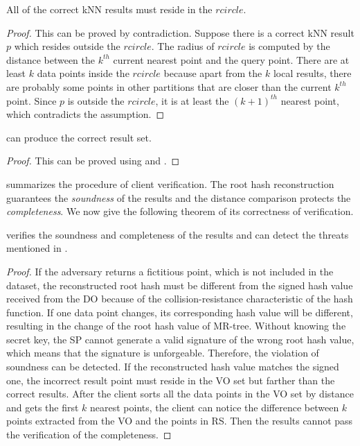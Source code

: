\begin{lemma}\label{lem:knn:l2}
  All of the correct kNN results must reside in the $rcircle$.
\end{lemma}

\begin{proof}
  This can be proved by contradiction. Suppose there is a correct kNN result $p$ which resides outside the $rcircle$. The radius of $rcircle$ is computed by the distance between the $k^{th}$ current nearest point and the query point. There are at least $k$ data points inside the $rcircle$ because apart from the $k$ local results, there are probably some points in other partitions that are closer than the current $k^{th}$ point. Since $p$ is outside the $rcircle$, it is at least the ${(k+1)}^{th}$ nearest point, which contradicts the assumption.
\end{proof}

\begin{theorem}
   can produce the correct result set.
\end{theorem}

\begin{proof}
  This can be proved using  and .
\end{proof}

 summarizes the procedure of client verification. The root hash reconstruction guarantees the \emph{soundness} of the results and the distance comparison protects the \emph{completeness}. We now give the following theorem of its correctness of verification.

\begin{theorem}\label{thm:knn:verify}
   verifies the soundness and completeness of the results and can detect the threats mentioned in .
\end{theorem}

\begin{proof}
  If the adversary returns a fictitious point, which is not included in the dataset, the reconstructed root hash must be different from the signed hash value received from the DO because of the collision-resistance characteristic of the hash function. If one data point changes, its corresponding hash value will be different, resulting in the change of the root hash value of MR-tree. Without knowing the secret key, the SP cannot generate a valid signature of the wrong root hash value, which means that the signature is unforgeable. Therefore, the violation of soundness can be detected. If the reconstructed hash value matches the signed one, the incorrect result point must reside in the VO set but farther than the correct results. After the client sorts all the data points in the VO set by distance and gets the first $k$ nearest points, the client can notice the difference between $k$ points extracted from the VO and the points in RS\@. Then the results cannot pass the verification of the completeness.
\end{proof}

